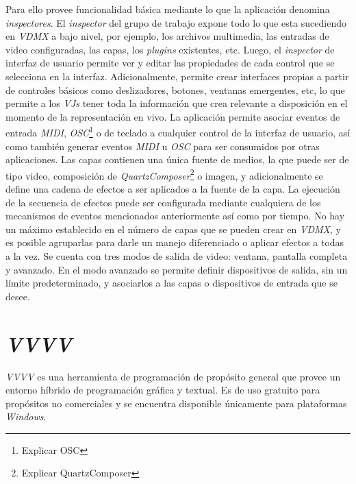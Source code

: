 Para ello provee funcionalidad básica mediante lo que la aplicación denomina \emph{inspectores}. El \emph{inspector} del grupo de trabajo expone todo lo que esta sucediendo en \emph{VDMX} a bajo nivel, por ejemplo, los archivos multimedia, las entradas de video configuradas, las capas, los \emph{plugins} existentes, etc. Luego, el \emph{inspector} de interfaz de usuario permite ver y editar las propiedades de cada control que se selecciona en la interfaz. Adicionalmente, permite crear interfaces propias a partir de controles básicos como deslizadores, botones, ventanas emergentes, etc, lo que permite a los \emph{VJs} tener toda la información que crea relevante a disposición en el momento de la representación en vivo.
La aplicación permite asociar eventos de entrada \emph{MIDI}, \emph{OSC}\footnote{Explicar OSC} o de teclado a cualquier control de la interfaz de usuario, así como también generar eventos \emph{MIDI} u \emph{OSC} para ser consumidos por otras aplicaciones.
Las capas contienen una única fuente de medios, la que puede ser de tipo video, composición de \emph{QuartzComposer}\footnote{Explicar QuartzComposer} o imagen, y adicionalmente se define una cadena de efectos a ser aplicados a la fuente de la capa. La ejecución de la secuencia de efectos puede ser configurada mediante cualquiera de los mecanismos de eventos mencionados anteriormente así como por tiempo. No hay un máximo establecido en el número de capas que se pueden crear en \emph{VDMX}, y es posible agruparlas para darle un manejo diferenciado o aplicar efectos a todas a la vez.
Se cuenta con tres modos de salida de video: ventana, pantalla completa y avanzado. En el modo avanzado se permite definir dispositivos de salida, sin un límite predeterminado, y asociarlos a las capas o dispositivos de entrada que se desee.


\section{\emph{VVVV}}
\emph{VVVV} \cite{VVVV} es una herramienta de programación de propósito general que provee un entorno híbrido de programación gráfica y textual. Es de uso gratuito para propósitos no comerciales y se encuentra disponible únicamente para plataformas \emph{Windows}.

